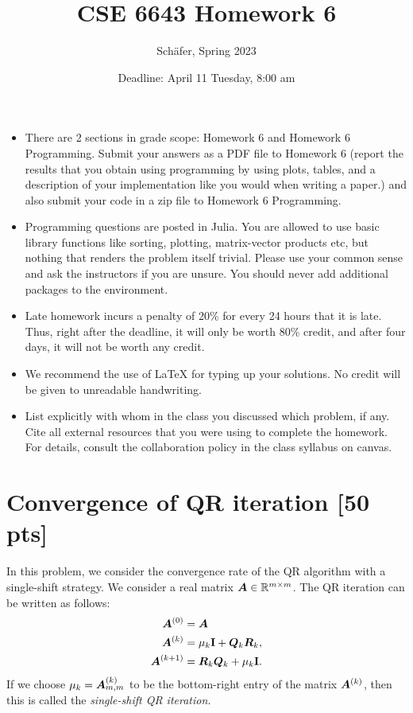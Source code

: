 \documentclass[twoside,10pt]{article}
\begin{document}
\title{CSE 6643 Homework 6}
\author{Sch{\"a}fer, Spring 2023}
\date{Deadline: April 11 Tuesday, 8:00 am}
\maketitle

\begin{itemize}
  \item There are 2 sections in grade scope: Homework 6 and Homework 6 Programming. Submit your answers as a PDF file to Homework 6 (report the results that you obtain using programming by using plots, tables, and a description of your implementation like you would when writing a paper.) and also submit your code in a zip file to Homework 6 Programming. 
  \item Programming questions are posted in Julia. You are allowed to use basic library functions like sorting, plotting, matrix-vector products etc, but nothing that renders the problem itself trivial. Please use your common sense and ask the instructors if you are unsure. 
  You should never add additional packages to the environment.
  \item Late homework incurs a penalty of 20\% for every 24 hours that it is late. Thus, right after the deadline, it will only be worth 80\% credit, and after four days, it will not be worth any credit. 
  \item We recommend the use of LaTeX for typing up your solutions. No credit will be given to unreadable handwriting.
  \item List explicitly with whom in the class you discussed which problem, if any. Cite all external resources that you were using to complete the homework. For details, consult the collaboration policy in the class syllabus on canvas.
\end{itemize}


\section{Convergence of QR iteration [50 pts]}
  In this problem, we consider the convergence rate of the QR algorithm with a single-shift strategy. We consider a real matrix $\bm{A} \in \mathbb{R}^{m \times m}$. 
  The QR iteration can be written as follows:
  \begin{align}
    \bm{A}^{(0)} &= \bm{A} \\
    \bm{A}^{(k)} &= \mu_k \mathbf{I} + \bm{Q}_k \bm{R}_k,\\
    \bm{A}^{(k+1)} &= \bm{R}_k \bm{Q}_k + \mu_k \mathbf{I}.
  \end{align}
  If we choose $\mu_k = \bm{A}_{m, m}^{(k)}$ to be the bottom-right entry of the matrix $\bm{A}^{(k)}$, then this is called the \emph{single-shift QR iteration.}
\end{document}
